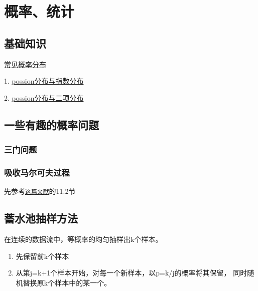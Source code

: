 \chapter{概率、统计}
\section{基础知识}
\href{https://paul.pub/common-probability-distributions/#id-%E6%A6%82%E7%8E%87%E8%B4%A8%E9%87%8F%E5%87%BD%E6%95%B0}{常见概率分布}

1. \href{https://blog.csdn.net/saltriver/article/details/53982885}{possion分布与指数分布}

2. \href{https://zhuanlan.zhihu.com/p/26433704}{possion分布与二项分布}

\section{一些有趣的概率问题}
\subsection{三门问题}

\subsection{吸收马尔可夫过程}
先参考\href{http://www.dartmouth.edu/~chance/teaching_aids/books_articles/probability_book/Chapter11.pdf}
{\texttt{这篇文献}}的11.2节

\section{蓄水池抽样方法}
在连续的数据流中，等概率的均匀抽样出k个样本。
\begin{enumerate}
\item 先保留前k个样本
\item 从第j=k+1个样本开始，对每一个新样本，以p=k/j的概率将其保留，
同时随机替换原k个样本中的某一个。
\end{enumerate}

